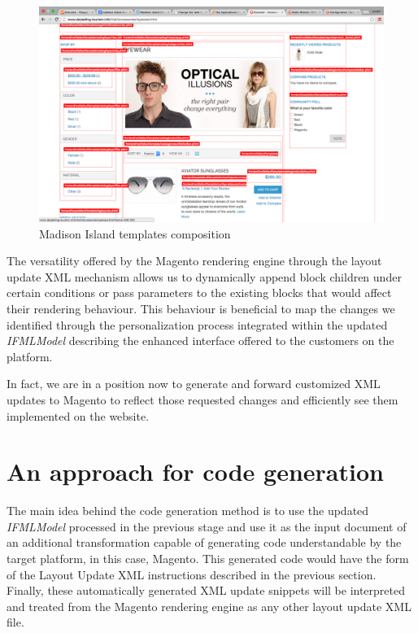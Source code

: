 \vspace{0.5cm}
\begin{figure}[H]
  \centering
    \includegraphics[width=14cm]{images/magento/madison-island-theme.png}
  \caption{Madison Island templates composition}
  \label{fig:magento-madison-island-theme}
\end{figure}
\vspace{0.5cm}

The versatility offered by the Magento rendering engine through the layout update XML mechanism allows us to dynamically append block children under certain conditions or pass parameters to the existing blocks that would affect their rendering behaviour. This behaviour is beneficial to map the changes we identified through the personalization process integrated within the updated \textit{IFMLModel} describing the enhanced interface offered to the customers on the platform.

In fact, we are in a position now to generate and forward customized XML updates to Magento to reflect those requested changes and efficiently see them implemented on the website.

\newpage
\section{An approach for code generation}

The main idea behind the code generation method is to use the updated \textit{IFMLModel} processed in the previous stage and use it as the input document of an additional transformation capable of generating code understandable by the target platform, in this case, Magento. This generated code would have the form of the Layout Update XML instructions described in the previous section. Finally, these automatically generated XML update snippets will be interpreted and treated from the Magento rendering engine as any other layout update XML file.

